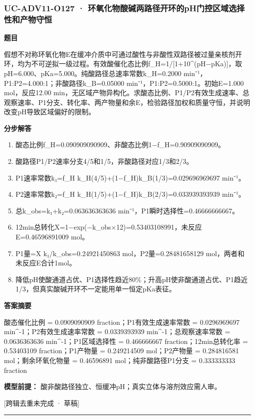 \documentclass[UTF8,11pt,a4paper]{ctexart}
\begin{document}
\subsubsection*{UC-ADV11-O127 · 环氧化物酸碱两路径开环的pH门控区域选择性和产物守恒}
\noindent\textbf{题目}\par
假想不对称环氧化物E在缓冲介质中可通过酸性与非酸性双路径被过量亲核剂开环，均为不可逆拟一级过程。有效酸催化态比例f\_H=1/[1+10\textasciicircum{}(pH−pKa)]，取pH=6.000、pKa=5.000。纯酸路径总速率常数k\_H=0.2000 min⁻¹，P1:P2=4.000:1；非酸路径k\_B=0.05000 min⁻¹，P1:P2=0.5000:1。初始E=1.000 mol，反应12.00 min，无区域产物异构化。求酸态比例、P1/P2有效生成速率、总观察速率、P1分支、转化率、两产物量和余E，检验路径加权和质量守恒，并说明改变pH导致区域偏好的限制。\par
\medskip\noindent\textbf{分步解答}
\begin{enumerate}
\item 酸态比例f\_H=0.090909090909、非酸态比例1−f\_H=0.90909090909。
\item 酸路径P1/P2速率分支4/5和1/5，非酸路径对应1/3和2/3。
\item P1速率常数k₁=f\_H k\_H(4/5)+(1−f\_H)k\_B(1/3)=0.029696969697 min⁻¹。
\item P2速率常数k₂=f\_H k\_H(1/5)+(1−f\_H)k\_B(2/3)=0.033939393939 min⁻¹。
\item 总k\_obs=k₁+k₂=0.063636363636 min⁻¹，P1瞬时选择性=0.46666666667。
\item 12min总转化X=1−exp(−k\_obs×12)=0.53403108991，未反应E=0.46596891009 mol。
\item P1量=X k₁/k\_obs=0.24921450863 mol，P2量=0.28481658129 mol，两者和未反应E合计1mol。
\item 降低pH使酸通道占优、P1选择性趋近80\%；升高pH使非酸通道占优、P1趋近1/3，但真实酸碱开环不一定能用单一恒定pKa表征。
\end{enumerate}
\noindent\textbf{答案摘要}\par
酸态催化比例 = 0.0909090909 fraction；P1有效生成速率常数 = 0.0296969697 min\textasciicircum{}-1；P2有效生成速率常数 = 0.0339393939 min\textasciicircum{}-1；总观察速率常数 = 0.0636363636 min\textasciicircum{}-1；P1区域选择性 = 0.466666667 fraction；12min总转化率 = 0.53403109 fraction；P1产物量 = 0.249214509 mol；P2产物量 = 0.284816581 mol；剩余环氧化物量 = 0.46596891 mol；纯非酸路径P1分支 = 0.333333333 fraction\par
\noindent\textbf{模型前提：}
酸非酸路径独立、恒缓冲pH；真实立体与溶剂效应需人审。\par
\noindent\textcolor{red!65!black}{[跨辑去重未完成 · 草稿]} \par
\medskip\hrule\medskip
{}
\end{document}

